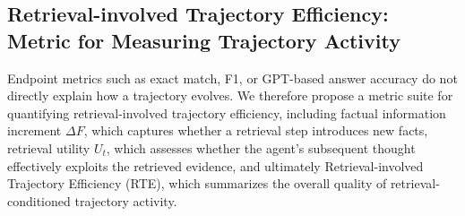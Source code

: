 \documentclass{article} %
\begin{document}



\subsection{Retrieval-involved Trajectory Efficiency: Metric for Measuring Trajectory Activity}
Endpoint metrics such as exact match, F1, or GPT-based answer accuracy do not directly explain how a trajectory evolves. 
We therefore propose a metric suite for quantifying retrieval-involved trajectory efficiency, including factual information increment $\Delta F$, which captures whether a retrieval step introduces new facts, retrieval utility $U_t$, which assesses whether the agent's subsequent thought effectively exploits the retrieved evidence, and ultimately Retrieval-involved Trajectory Efficiency (RTE), which summarizes the overall quality of retrieval-conditioned trajectory activity.
\end{document}
